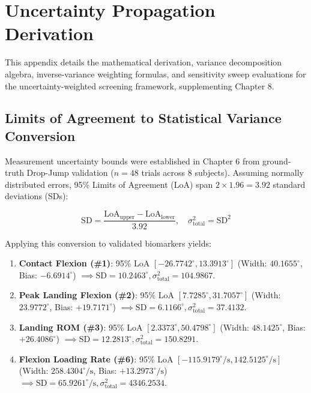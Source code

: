 \chapter{Uncertainty Propagation Derivation}
\label{app:uncertainty-deriv}



This appendix details the mathematical derivation, variance decomposition algebra, inverse-variance weighting formulas, and sensitivity sweep evaluations for the uncertainty-weighted screening framework, supplementing Chapter 8.



\section{Limits of Agreement to Statistical Variance Conversion}
\label{sec:a-1-limits-of-agreement-to-statistical-variance-conversion}


Measurement uncertainty bounds were established in Chapter 6 from ground-truth Drop-Jump validation ($n = 48$ trials across 8 subjects). Assuming normally distributed errors, 95\% Limits of Agreement (LoA) span $2 \times 1.96 = 3.92$ standard deviations (SDs):

\begin{equation}
  \text{SD} = \frac{\text{LoA}_{\text{upper}} - \text{LoA}_{\text{lower}}}{3.92}, \quad \sigma^2_{\text{total}} = \text{SD}^2
  \label{eq:disp1}
\end{equation}

Applying this conversion to validated biomarkers yields:

\begin{enumerate}
  \item \textbf{Contact Flexion (\protect\#1)}: 95\% LoA $[-26.7742^\circ, 13.3913^\circ]$ (Width: $40.1655^\circ$, Bias: $-6.6914^\circ$) $\implies \text{SD} = 10.2463^\circ, \sigma^2_{\text{total}} = 104.9867$.
  \item \textbf{Peak Landing Flexion (\protect\#2)}: 95\% LoA $[7.7285^\circ, 31.7057^\circ]$ (Width: $23.9772^\circ$, Bias: $+19.7171^\circ$) $\implies \text{SD} = 6.1166^\circ, \sigma^2_{\text{total}} = 37.4132$.
  \item \textbf{Landing ROM (\protect\#3)}: 95\% LoA $[2.3373^\circ, 50.4798^\circ]$ (Width: $48.1425^\circ$, Bias: $+26.4086^\circ$) $\implies \text{SD} = 12.2813^\circ, \sigma^2_{\text{total}} = 150.8291$.
  \item \textbf{Flexion Loading Rate (\protect\#6)}: 95\% LoA $[-115.9179^\circ/\text{s}, 142.5125^\circ/\text{s}]$ (Width: $258.4304^\circ/\text{s}$, Bias: $+13.2973^\circ/\text{s}$) $\implies \text{SD} = 65.9261^\circ/\text{s}, \sigma^2_{\text{total}} = 4346.2534$.
\end{enumerate}



